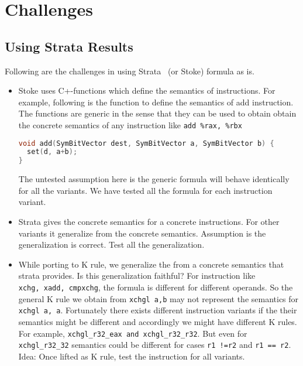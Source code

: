 \section{Challenges}

\subsection{Using Strata Results}
 Following are the challenges in using Strata~\cite{Heule2016a} (or Stoke) 
 formula as is.    
 
\begin{itemize}
\item
  Stoke uses C+-functions which define the semantics 
  of instructions. For example, following is the function to 
  define the semantics of add instruction. The functions are 
  generic in the sense that they can be used to obtain obtain 
  the concrete semantics
  of any instruction like \texttt{add\ \%rax,\ \%rbx}
  
  \begin{lstlisting}[language=C]
void add(SymBitVector dest, SymBitVector a, SymBitVector b) {
  set(d, a+b);
}
\end{lstlisting}
  
  The untested assumption here is the generic formula will behave identically for all
  the variants. We have tested all the formula for each instruction variant. 
  
\item
  Strata gives the concrete semantics for a concrete instructions. For
  other variants it generalize from the concrete semantics. Assumption
  is the generalization is correct. Test all the generalization.
\item
  While porting to K rule, we generalize the from a concrete semantics
  that strata provides. Is this generalization faithful? For instruction
  like \texttt{xchg,\ xadd,\ cmpxchg}, the formula is different for
  different operands. So the general K rule we obtain from
  \texttt{xchgl\ a,b} may not represent the semantics for
  \texttt{xchgl\ a,\ a}. Fortunately there exists different instruction
  variants if the their semantics might be different and accordingly we
  might have different K rules. For example,
  \texttt{xchgl\_r32\_eax\ and\ xchgl\_r32\_r32}. But even for
  \texttt{xchgl\_r32\_32} semantics could be different for cases
  \texttt{r1\ !=r2} and \texttt{r1\ ==\ r2}. Idea: Once lifted as K
  rule, test the instruction for all variants.
\end{itemize}

